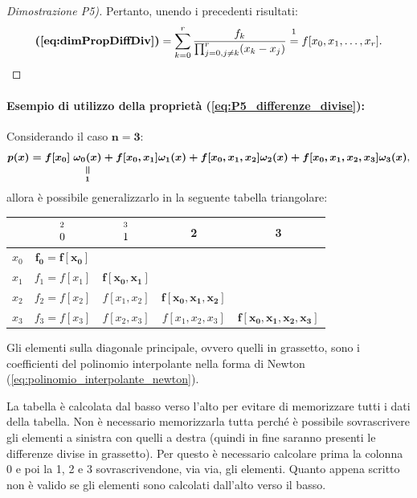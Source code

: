 \begin{proof}[Dimostrazione P5)]
    Pertanto, unendo i precedenti risultati:
    \begin{equation*}
        \textbf{(\ref{eq:dimPropDiffDiv})}=\sum_{k=0}^r\frac{f_k}{\prod_{j=0,j\neq k}^r (x_k-x_j)}\overset{\footnotemark}{=} f[x_0,x_1,\hdots,x_r].
    \end{equation*}
\end{proof}

\paragraph{Esempio di utilizzo della proprietà (\ref{eq:P5_differenze_divise}):} Considerando il caso $\boldsymbol{n=3}$:
\begin{equation*}
    \boldsymbol{p(x)=f[x_0]\;\equalto{\omega_0(x)}{1}+f[x_0,x_1]\omega_1(x)+f[x_0,x_1,x_2]\omega_2(x)+f[x_0,x_1,x_2,x_3]\omega_3(x)},
\end{equation*}
allora è possibile generalizzarlo in la seguente tabella triangolare:
 
\begin{center}
\begin{tabular}{|c|c|c|c|c|} 
\hline
 & $\overset{\footnotemark}{0}$ & $\overset{\footnotemark}{1}$ & 2 & 3 \\
\hline
$x_0$ & $\boldsymbol{f_0 = f[x_0]}$ & & &  \\ 
$x_1$ & $f_1 = f[x_1]$ & $\boldsymbol{f[x_0,x_1]}$ & &  \\ 
$x_2$ & $f_2 = f[x_2]$ & $f[x_1,x_2]$ &$ \boldsymbol{f[x_0,x_1,x_2]}$ & \\
$x_3$ & $f_3 = f[x_3]$ & $f[x_2, x_3]$ & $f[x_1,x_2,x_3]$ & $\boldsymbol{f[x_0,x_1,x_2,x_3]}$ \\
\hline
\end{tabular}
\end{center}
\addtocounter{footnote}{-1}


Gli elementi sulla diagonale principale, ovvero quelli in grassetto, sono i coefficienti del polinomio interpolante nella forma di Newton (\ref{eq:polinomio_interpolante_newton}).

La tabella è calcolata dal basso verso l'alto per evitare di memorizzare tutti i dati della tabella. Non è necessario memorizzarla tutta perché è possibile sovrascrivere gli elementi a sinistra con quelli a destra (quindi in fine saranno presenti le differenze divise in grassetto). Per questo è necessario calcolare prima la colonna 0 e poi la 1, 2 e 3 sovrascrivendone, via via, gli elementi. Quanto appena scritto non è valido se gli elementi sono calcolati dall'alto verso il basso.


